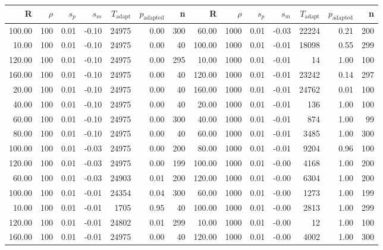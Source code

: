 \begin{table}[ht]
\centering
{\tiny
\begin{tabular}{|rrrrrrr||rrrrrrr|}
  \hline
R & $\rho$ & $s_p$ & $s_m$ & $T_\text{adapt}$ & $p_\text{adapted}$ & n & R & $\rho$ & $s_p$ & $s_m$ & $T_\text{adapt}$ & $p_\text{adapted}$ & n \\ 
  \hline
100.00 & 100 & 0.01 & -0.10 & 24975 & 0.00 & 300 & 60.00 & 1000 & 0.01 & -0.03 & 22224 & 0.21 & 200 \\ 
  10.00 & 100 & 0.01 & -0.10 & 24975 & 0.00 & 40 & 100.00 & 1000 & 0.01 & -0.01 & 18098 & 0.55 & 299 \\ 
  120.00 & 100 & 0.01 & -0.10 & 24975 & 0.00 & 295 & 10.00 & 1000 & 0.01 & -0.01 & 14 & 1.00 & 100 \\ 
  160.00 & 100 & 0.01 & -0.10 & 24975 & 0.00 & 40 & 120.00 & 1000 & 0.01 & -0.01 & 23242 & 0.14 & 297 \\ 
  20.00 & 100 & 0.01 & -0.10 & 24975 & 0.00 & 40 & 160.00 & 1000 & 0.01 & -0.01 & 24762 & 0.01 & 100 \\ 
  40.00 & 100 & 0.01 & -0.10 & 24975 & 0.00 & 40 & 20.00 & 1000 & 0.01 & -0.01 & 136 & 1.00 & 100 \\ 
  60.00 & 100 & 0.01 & -0.10 & 24975 & 0.00 & 300 & 40.00 & 1000 & 0.01 & -0.01 & 874 & 1.00 & 99 \\ 
  80.00 & 100 & 0.01 & -0.10 & 24975 & 0.00 & 40 & 60.00 & 1000 & 0.01 & -0.01 & 3485 & 1.00 & 300 \\ 
  100.00 & 100 & 0.01 & -0.03 & 24975 & 0.00 & 200 & 80.00 & 1000 & 0.01 & -0.01 & 9204 & 0.96 & 100 \\ 
  120.00 & 100 & 0.01 & -0.03 & 24975 & 0.00 & 199 & 100.00 & 1000 & 0.01 & -0.00 & 4168 & 1.00 & 200 \\ 
  60.00 & 100 & 0.01 & -0.03 & 24903 & 0.01 & 200 & 120.00 & 1000 & 0.01 & -0.00 & 6304 & 1.00 & 200 \\ 
  100.00 & 100 & 0.01 & -0.01 & 24354 & 0.04 & 300 & 60.00 & 1000 & 0.01 & -0.00 & 1273 & 1.00 & 199 \\ 
  10.00 & 100 & 0.01 & -0.01 & 1705 & 0.95 & 40 & 100.00 & 1000 & 0.01 & -0.00 & 2813 & 1.00 & 299 \\ 
  120.00 & 100 & 0.01 & -0.01 & 24802 & 0.01 & 299 & 10.00 & 1000 & 0.01 & -0.00 & 12 & 1.00 & 100 \\ 
  160.00 & 100 & 0.01 & -0.01 & 24975 & 0.00 & 40 & 120.00 & 1000 & 0.01 & -0.00 & 4002 & 1.00 & 300 \\ 

\end{tabular}}
\end{table}
